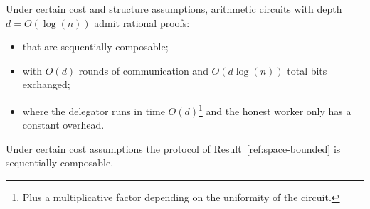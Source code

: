 {%
\begin{result}\label{res:sq1}
	Under certain cost and structure assumptions, arithmetic circuits with depth $d = O(\log(n))$ admit rational proofs:
	\begin{itemize}
		\item that are sequentially composable;
		\item with $O(d)$ rounds of communication and $O(d \log(n))$ total bits exchanged;
		\item where the delegator runs in time $O(d)$\footnote{Plus a multiplicative factor depending on the uniformity of the circuit.} and the honest worker only has a constant overhead.
	\end{itemize}
\end{result}

\begin{result}\label{res:sq2}
	Under certain cost assumptions the protocol of Result~\ref{ref:space-bounded} is sequentially composable.
\end{result}

\begin{comment}
Our results above assume a "No Free Computation" assumption stating roughly: ``if a machine uses only a fraction $\gamma$ of the resources expected to compute $f(x)$ then it should expect an error probability of at least roughly $1-\gamma$''\footnote{As a rough analogy, one can think about it as if the function $f$ acted as a random oracle and thus can only be brute-forced.}.
Such an assumption is required for multiple delegations as we need some guarantee on the error probability of a ``lazy'' worker.
This assumption has a few limitations: it is specific to a distribution thus not necessarily supporting arbitrary inputs; it may be strongly tied to a specific model of computation (e.g. circuit vs Turing machines); it is an open problem whether it naturally holds for certain classes of problems.
\end{comment}

}
